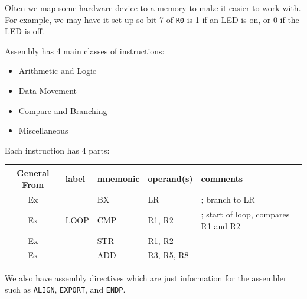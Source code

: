 \documentclass[12pt,letterpaper]{article} \usepackage{amsmath} \usepackage{graphicx} \usepackage[margin=1in]{geometry} \usepackage{longtable}  \usepackage{amssymb}
\begin{document}
	Often we map some hardware device to a memory to make it easier to work with. For example, we may have it set up so bit 7 of \verb*|R0| is 1 if an LED is on, or 0 if the LED is off. 
	
	Assembly has 4 main classes of instructions:
	\begin{itemize}
		\item Arithmetic and Logic
		\item Data Movement
		\item Compare and Branching
		\item Miscellaneous
	\end{itemize}
	
	Each instruction has 4 parts:
	\begin{center}
		\begin{tabular}{|c||l|l|l|l|}
			\hline
			General From & label & mnemonic & operand(s) & comments \\
			\hline\hline
			Ex &  & BX & LR & ; branch to LR \\
			\hline
			Ex & LOOP & CMP & R1, R2 & ; start of loop, compares R1 and R2 \\
			\hline
			Ex &  & STR & R1, R2 &  \\
			\hline
			Ex &  & ADD & R3, R5, R8 &  \\
			\hline
		\end{tabular}
	\end{center}
	
	We also have assembly directives which are just information for the assembler such as \verb*|ALIGN|, \verb*|EXPORT|, and \verb|ENDP|.
	
\end{document}
